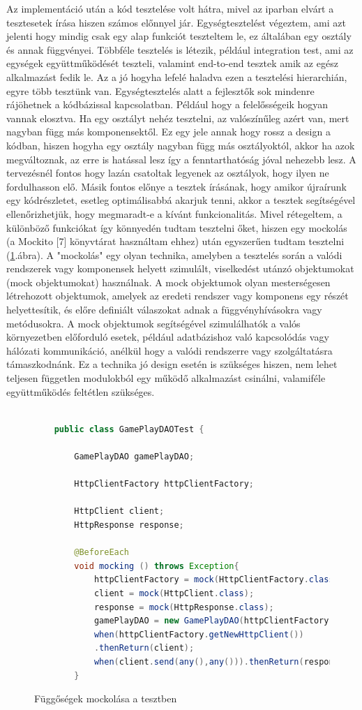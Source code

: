 \documentclass[a4paper,twoside]{article}
\begin{document}
Az implementáció után a kód tesztelése volt hátra, mivel az iparban elvárt a tesztesetek írása hiszen számos előnnyel jár.
Egységtesztelést végeztem, ami azt jelenti hogy mindig csak egy alap funkciót teszteltem le, ez általában egy osztály és annak függvényei. Többféle tesztelés is létezik, például integration test, ami az egységek együttműködését teszteli, valamint end-to-end tesztek amik az egész alkalmazást fedik le. Az a jó hogyha lefelé haladva ezen a tesztelési hierarchián, egyre több tesztünk van. Egységtesztelés 
alatt a fejlesztők sok mindenre rájöhetnek a kódbázissal kapcsolatban. Például hogy a felelősségeik hogyan vannak elosztva. Ha egy osztályt nehéz tesztelni, az valószínűleg azért van, mert nagyban függ más komponensektől. Ez egy jele annak hogy rossz a design a kódban, hiszen hogyha egy osztály nagyban függ más osztályoktól, akkor ha azok megváltoznak, az erre is hatással lesz így a fenntarthatóság jóval nehezebb lesz. A tervezésnél fontos hogy lazán csatoltak legyenek az osztályok, hogy ilyen ne fordulhasson elő. Másik fontos előnye a tesztek írásának, hogy amikor újraírunk egy kódrészletet, esetleg optimálisabbá akarjuk tenni, akkor a tesztek segítségével ellenőrizhetjük, hogy megmaradt-e a kívánt funkcionalitás.  Mivel rétegeltem, a különböző funkciókat így könnyedén tudtam tesztelni őket, hiszen
egy mockolás (a Mockito [7] könyvtárat használtam ehhez) után egyszerűen tudtam tesztelni (\ref{mocking}.ábra).
A "mockolás" egy olyan technika, amelyben a tesztelés során a valódi rendszerek vagy
komponensek helyett szimulált, viselkedést utánzó objektumokat (mock objektumokat) használnak.
A mock objektumok olyan mesterségesen létrehozott objektumok, amelyek az
eredeti rendszer vagy komponens egy részét helyettesítik, és előre definiált válaszokat adnak a
függvényhívásokra vagy metódusokra. A mock objektumok segítségével szimulálhatók a
valós környezetben előforduló esetek, például adatbázishoz való kapcsolódás vagy hálózati
kommunikáció, anélkül hogy a valódi rendszerre vagy szolgáltatásra támaszkodnánk. Ez a technika jó design esetén is szükséges hiszen, nem lehet teljesen független modulokból egy működő alkalmazást csinálni, valamiféle együttműködés feltétlen szükséges. 
\begin{figure}[h]
	\caption{Függőségek mockolása a tesztben}
	\raggedleft
	\begin{lstlisting}[language=java]
		
	public class GamePlayDAOTest {
		
		GamePlayDAO gamePlayDAO;
		
		HttpClientFactory httpClientFactory;
		
		HttpClient client;
		HttpResponse response;
		
		@BeforeEach
		void mocking () throws Exception{
			httpClientFactory = mock(HttpClientFactory.class);
			client = mock(HttpClient.class);
			response = mock(HttpResponse.class);
			gamePlayDAO = new GamePlayDAO(httpClientFactory);
			when(httpClientFactory.getNewHttpClient())
			.thenReturn(client);
			when(client.send(any(),any())).thenReturn(response);
		}
	\end{lstlisting}
	\label{mocking}
\end{figure} 
\end{document}

